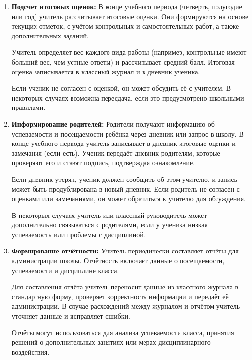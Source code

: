 \documentclass[a4paper, final]{article}
\begin{document}
\begin{enumerate}
  \item \textbf{Подсчет итоговых оценок:} В конце учебного периода (четверть, полугодие или год) учитель рассчитывает итоговые оценки. Они формируются на основе текущих отметок, с учётом контрольных и самостоятельных работ, а также дополнительных заданий.

  Учитель определяет вес каждого вида работы (например, контрольные имеют больший вес, чем устные ответы) и рассчитывает средний балл. Итоговая оценка записывается в классный журнал и в дневник ученика.
  
  Если ученик не согласен с оценкой, он может обсудить её с учителем. В некоторых случаях возможна пересдача, если это предусмотрено школьными правилами.
  
  \item \textbf{Информирование родителей:} Родители получают информацию об успеваемости и посещаемости ребёнка через дневник или запрос в школу. В конце учебного периода учитель записывает в дневник итоговые оценки и замечания (если есть). Ученик передаёт дневник родителям, которые проверяют его и ставят подпись, подтверждая ознакомление.

  Если дневник утерян, ученик должен сообщить об этом учителю, и запись может быть продублирована в новый дневник. Если родитель не согласен с оценками или замечаниями, он может обратиться к учителю для обсуждения.
  
  В некоторых случаях учитель или классный руководитель может дополнительно связываться с родителями, если у ученика низкая успеваемость или проблемы с дисциплиной.

  \item \textbf{Формирование отчётности:} Учитель периодически составляет отчёты для администрации школы. Отчётность включает данные о посещаемости, успеваемости и дисциплине класса.

  Для составления отчёта учитель переносит данные из классного журнала в стандартную форму, проверяет корректность информации и передаёт её администрации. В случае расхождений между журналом и отчётом учитель уточняет данные и исправляет ошибки.
  
  Отчёты могут использоваться для анализа успеваемости класса, принятия решений о дополнительных занятиях или мерах дисциплинарного воздействия.
\end{enumerate}
\end{document}
